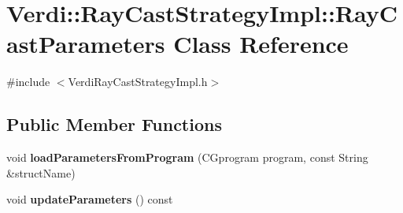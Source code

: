 \hypertarget{class_verdi_1_1_ray_cast_strategy_impl_1_1_ray_cast_parameters}{\section{\-Verdi\-:\-:\-Ray\-Cast\-Strategy\-Impl\-:\-:\-Ray\-Cast\-Parameters \-Class \-Reference}
\label{class_verdi_1_1_ray_cast_strategy_impl_1_1_ray_cast_parameters}
}


{\ttfamily \#include $<$\-Verdi\-Ray\-Cast\-Strategy\-Impl.\-h$>$}

\subsection*{\-Public \-Member \-Functions}
\begin{DoxyCompactItemize}
\item 
\hypertarget{class_verdi_1_1_ray_cast_strategy_impl_1_1_ray_cast_parameters_a31ad7b323b1c3bf742e64201889bc00e}{void {\bfseries load\-Parameters\-From\-Program} (\-C\-Gprogram program, const \-String \&struct\-Name)}\label{class_verdi_1_1_ray_cast_strategy_impl_1_1_ray_cast_parameters_a31ad7b323b1c3bf742e64201889bc00e}

\item 
\hypertarget{class_verdi_1_1_ray_cast_strategy_impl_1_1_ray_cast_parameters_a869808282b0426286d3d7c69acec16a5}{void {\bfseries update\-Parameters} () const }\label{class_verdi_1_1_ray_cast_strategy_impl_1_1_ray_cast_parameters_a869808282b0426286d3d7c69acec16a5}

\end{DoxyCompactItemize}

